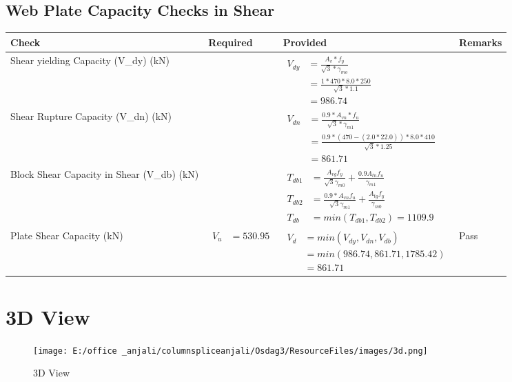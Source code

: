\documentclass{article}%
\begin{document}
\subsection{Web Plate Capacity Checks in Shear}%
\label{subsec:WebPlateCapacityChecksinShear}%
\renewcommand{\arraystretch}{1.2}%
\begin{longtable}{|p{4cm}|p{6cm}|p{5.5cm}|p{1.5cm}|}%
\hline%
\rowcolor{OsdagGreen}%
Check&Required&Provided&Remarks\\%
\hline%
\endhead%
\hline%
Shear yielding Capacity (V\_dy) (kN)&&$\begin{aligned} V_{dy} &= \frac{A_v*f_y}{\sqrt{3}*\gamma_{mo}}\\ &=\frac{1*470*8.0*250}{\sqrt{3}*1.1}\\ &=986.74\end{aligned}$&\\%
\hline%
Shear Rupture Capacity (V\_dn) (kN)&&$\begin{aligned} V_{dn} &= \frac{0.9*A_{vn}*f_u}{\sqrt{3}*\gamma_{m1}}\\ &= \frac{0.9 *(470-(2.0*22.0))*8.0*410}{\sqrt{3}*1.25}\\ &=861.71\end{aligned}$&\\%
\hline%
Block Shear Capacity in Shear (V\_db) (kN)&&$\begin{aligned}T_{db1} &= \frac{A_{vg} f_{y}}{\sqrt{3} \gamma_{m0}} + \frac{0.9 A_{tn} f_{u}}{\gamma_{m1}}\\ T_{db2} &= \frac{0.9*A_{vn} f_{u}}{\sqrt{3} \gamma_{m1}} + \frac{A_{tg} f_{y}}{\gamma_{m0}}\\ T_{db} &= min(T_{db1}, T_{db2})= 1109.9\end{aligned}$&\\%
\hline%
Plate Shear Capacity (kN)&$\begin{aligned} V_u &=530.95\end{aligned}$&$\begin{aligned} V_d &= min(V_{dy},V_{dn},V_{db})\\ &= min(986.74,861.71,1785.42)\\ &=861.71\end{aligned}$&Pass\\%
\hline%
\end{longtable}

%
%
\newpage%
\section{3D View}%
\label{sec:3DView}%


\begin{figure}[h!]%
\centering%
\texttt{[image: E:/office \_anjali/columnspliceanjali/Osdag3/ResourceFiles/images/3d.png]}%
\caption{3D View}%
\end{figure}

%
\end{document}
